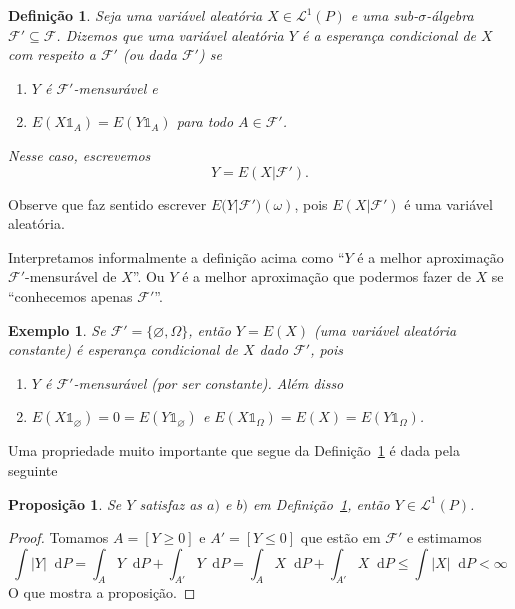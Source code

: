 \documentclass[reqno, final]{book}
\newcommand*\1{\mathds{1}}
\newtheorem{proposition}[theorem]{Proposição}
\newtheorem{definition}[theorem]{Definição}
\newtheorem{example}{Exemplo}[section]
\renewcommand*\d{\mathop{}\!\mathrm{d}}
\begin{document}
\begin{definition}
  \label{d:esperanca_condicional}
  Seja uma variável aleatória $X \in \mathcal{L}^1(P)$ e uma sub-$\sigma$-álgebra $\mathcal{F}' \subseteq \mathcal{F}$.
  Dizemos que uma variável aleatória $Y$ é a esperança condicional  de $X$ com respeito a $\mathcal{F}'$ (ou dada $\mathcal{F}'$) se
  \begin{enumerate}[\quad a)]
  \item $Y$ é $\mathcal{F}'$-mensurável e
  \item $E(X \1_{A}) = E(Y \1_{A})$ para todo $A \in \mathcal{F}'$.
  \end{enumerate}
  Nesse caso, escrevemos
  \begin{equation}
    Y = E(X | \mathcal{F}').
  \end{equation}
\end{definition}

Observe que faz sentido escrever $E\big(Y|\mathcal{F}'\big)(\omega)$, pois $E(X|\mathcal{F}')$ é uma variável aleatória.

Interpretamos informalmente a definição acima como ``$Y$ é a melhor aproximação $\mathcal{F}'$-mensurável de $X$''.
Ou $Y$ é a melhor aproximação que podermos fazer de $X$ se ``conhecemos apenas $\mathcal{F}'$''.

\begin{example}
  \label{x:EXF_trivial}
  Se $\mathcal{F}' = \{\varnothing, \Omega\}$, então $Y = E(X)$ (uma variável aleatória constante) é esperança condicional de $X$ dado $\mathcal{F}'$, pois
  \begin{enumerate}[\quad a)]
  \item $Y$ é $\mathcal{F}'$-mensurável (por ser constante). Além disso
  \item $E(X \1_\varnothing) = 0 = E(Y \1_\varnothing)$ e $E(X \1_\Omega) = E(X) = E(Y \1_\Omega)$.
  \end{enumerate}
\end{example}

Uma propriedade muito importante que segue da Definição~\ref{d:esperanca_condicional} é dada pela seguinte

\begin{proposition}
  \label{p:ec_em_L1}
  Se $Y$ satisfaz as $a)$ e $b)$ em Definição~\ref{d:esperanca_condicional}, então $Y \in \mathcal{L}^1(P)$.
\end{proposition}

\begin{proof}
  Tomamos $A = [Y \geq 0]$ e $A' = [Y \leq 0]$ que estão em $\mathcal{F}'$ e estimamos
  \begin{equation}
    \int |Y| \d P = \int_A Y \d P + \int_{A'} Y \d P = \int_A X \d P + \int_{A'} X \d P \leq \int |X| \d P < \infty
  \end{equation}
  O que mostra a proposição.
\end{proof}
\end{document}
